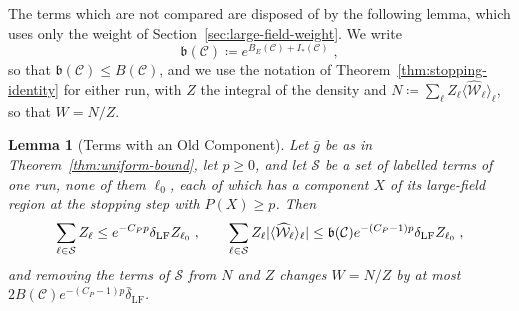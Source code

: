 \documentclass[11pt]{preprint}
\DeclarePairedDelimiter{\abs}{\lvert}{\rvert}
\numberwithin{equation}{section}
\newtheorem{lemma}[theorem]{Lemma}
\theoremstyle{definition}
\theoremstyle{remark}
\theoremstyle{plain}
\begin{document}
The terms which are not compared are disposed of by the following lemma, which uses only the weight of Section~\ref{sec:large-field-weight}. We write
\begin{equation}\label{eq:loop-majorant}
    \mathfrak b(\mathcal C) \coloneqq e^{B_E(\mathcal C) + I_*(\mathcal C)}\;,
\end{equation}
so that $\mathfrak b(\mathcal C) \leq B(\mathcal C)$, and we use the notation of Theorem~\ref{thm:stopping-identity} for either run, with $Z$ the integral of the density and $N \coloneqq \sum_\ell Z_\ell\langle\widehat{\mathcal W}_\ell\rangle_\ell$, so that $W = N/Z$.

\begin{lemma}[Terms with an Old Component]\label{lem:old-component}
Let $\bar g$ be as in Theorem~\ref{thm:uniform-bound}, let $p \geq 0$, and let $\mathcal S$ be a set of labelled terms of one run, none of them $\ell_0$, each of which has a component $X$ of its large-field region at the stopping step with $P(X) \geq p$. Then
\begin{equation}\label{eq:old-component}
    \sum_{\ell \in \mathcal S}Z_\ell \leq e^{-C_Pp}\delta_{\mathrm{LF}}Z_{\ell_0}\;,
    \qquad
    \sum_{\ell \in \mathcal S}Z_\ell\abs{\langle\widehat{\mathcal W}_\ell\rangle_\ell} \leq \mathfrak b(\mathcal C)e^{-(C_P-1)p}\delta_{\mathrm{LF}}Z_{\ell_0}\;,
\end{equation}
and removing the terms of $\mathcal S$ from $N$ and $Z$ changes $W = N/Z$ by at most $2B(\mathcal C)e^{-(C_P-1)p}\bar\delta_{\mathrm{LF}}$.
\end{lemma}
\end{document}
